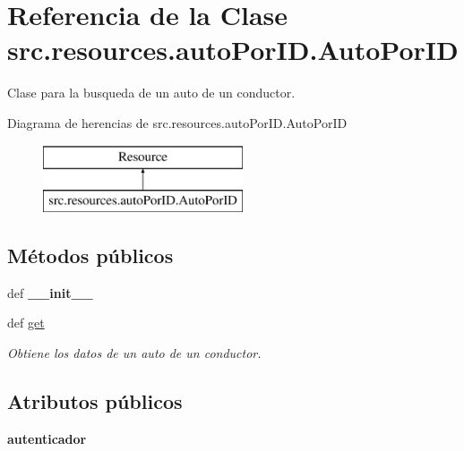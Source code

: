 \hypertarget{classsrc_1_1resources_1_1auto_por_i_d_1_1_auto_por_i_d}{\section{Referencia de la Clase src.\-resources.\-auto\-Por\-I\-D.\-Auto\-Por\-I\-D}
\label{classsrc_1_1resources_1_1auto_por_i_d_1_1_auto_por_i_d}
}


Clase para la busqueda de un auto de un conductor.  


Diagrama de herencias de src.\-resources.\-auto\-Por\-I\-D.\-Auto\-Por\-I\-D\begin{figure}[H]
\begin{center}
\leavevmode
\includegraphics[height=2.000000cm]{classsrc_1_1resources_1_1auto_por_i_d_1_1_auto_por_i_d}
\end{center}
\end{figure}
\subsection*{Métodos públicos}
\begin{DoxyCompactItemize}
\item 
\hypertarget{classsrc_1_1resources_1_1auto_por_i_d_1_1_auto_por_i_d_a2446724f31d69e60ffb2b866609499f6}{def {\bfseries \-\_\-\-\_\-init\-\_\-\-\_\-}}\label{classsrc_1_1resources_1_1auto_por_i_d_1_1_auto_por_i_d_a2446724f31d69e60ffb2b866609499f6}

\item 
def \hyperlink{classsrc_1_1resources_1_1auto_por_i_d_1_1_auto_por_i_d_a29f36e323532a28e015bbe60b353837d}{get}
\begin{DoxyCompactList}\small\item\em Obtiene los datos de un auto de un conductor. \end{DoxyCompactList}\end{DoxyCompactItemize}
\subsection*{Atributos públicos}
\begin{DoxyCompactItemize}
\item 
\hypertarget{classsrc_1_1resources_1_1auto_por_i_d_1_1_auto_por_i_d_a0c36cdf16a521489f5145f46abe15dd2}{{\bfseries autenticador}}\label{classsrc_1_1resources_1_1auto_por_i_d_1_1_auto_por_i_d_a0c36cdf16a521489f5145f46abe15dd2}

\end{DoxyCompactItemize}

